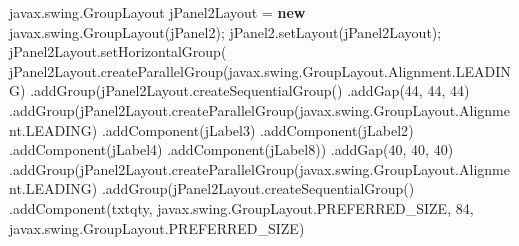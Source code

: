 \documentclass[
  10pt,
]{article}
\newenvironment{Shaded}{}{}
\newcommand{\DecValTok}[1]{\textcolor[rgb]{0.25,0.63,0.44}{#1}}
\newcommand{\FunctionTok}[1]{\textcolor[rgb]{0.02,0.16,0.49}{#1}}
\newcommand{\KeywordTok}[1]{\textcolor[rgb]{0.00,0.44,0.13}{\textbf{#1}}}
\newcommand{\NormalTok}[1]{#1}
\newcommand{\OperatorTok}[1]{\textcolor[rgb]{0.40,0.40,0.40}{#1}}
\begin{document}
\begin{Shaded}
\begin{Highlighting}[numbers=left,,]
\NormalTok{        javax}\OperatorTok{.}\FunctionTok{swing}\OperatorTok{.}\FunctionTok{GroupLayout}\NormalTok{ jPanel2Layout }\OperatorTok{=} \KeywordTok{new}\NormalTok{ javax}\OperatorTok{.}\FunctionTok{swing}\OperatorTok{.}\FunctionTok{GroupLayout}\OperatorTok{(}\NormalTok{jPanel2}\OperatorTok{);}
\NormalTok{        jPanel2}\OperatorTok{.}\FunctionTok{setLayout}\OperatorTok{(}\NormalTok{jPanel2Layout}\OperatorTok{);}
\NormalTok{        jPanel2Layout}\OperatorTok{.}\FunctionTok{setHorizontalGroup}\OperatorTok{(}
\NormalTok{            jPanel2Layout}\OperatorTok{.}\FunctionTok{createParallelGroup}\OperatorTok{(}\NormalTok{javax}\OperatorTok{.}\FunctionTok{swing}\OperatorTok{.}\FunctionTok{GroupLayout}\OperatorTok{.}\FunctionTok{Alignment}\OperatorTok{.}\FunctionTok{LEADING}\OperatorTok{)}
            \OperatorTok{.}\FunctionTok{addGroup}\OperatorTok{(}\NormalTok{jPanel2Layout}\OperatorTok{.}\FunctionTok{createSequentialGroup}\OperatorTok{()}
                \OperatorTok{.}\FunctionTok{addGap}\OperatorTok{(}\DecValTok{44}\OperatorTok{,} \DecValTok{44}\OperatorTok{,} \DecValTok{44}\OperatorTok{)}
                \OperatorTok{.}\FunctionTok{addGroup}\OperatorTok{(}\NormalTok{jPanel2Layout}\OperatorTok{.}\FunctionTok{createParallelGroup}\OperatorTok{(}\NormalTok{javax}\OperatorTok{.}\FunctionTok{swing}\OperatorTok{.}\FunctionTok{GroupLayout}\OperatorTok{.}\FunctionTok{Alignment}\OperatorTok{.}\FunctionTok{LEADING}\OperatorTok{)}
                    \OperatorTok{.}\FunctionTok{addComponent}\OperatorTok{(}\NormalTok{jLabel3}\OperatorTok{)}
                    \OperatorTok{.}\FunctionTok{addComponent}\OperatorTok{(}\NormalTok{jLabel2}\OperatorTok{)}
                    \OperatorTok{.}\FunctionTok{addComponent}\OperatorTok{(}\NormalTok{jLabel4}\OperatorTok{)}
                    \OperatorTok{.}\FunctionTok{addComponent}\OperatorTok{(}\NormalTok{jLabel8}\OperatorTok{))}
                \OperatorTok{.}\FunctionTok{addGap}\OperatorTok{(}\DecValTok{40}\OperatorTok{,} \DecValTok{40}\OperatorTok{,} \DecValTok{40}\OperatorTok{)}
                \OperatorTok{.}\FunctionTok{addGroup}\OperatorTok{(}\NormalTok{jPanel2Layout}\OperatorTok{.}\FunctionTok{createParallelGroup}\OperatorTok{(}\NormalTok{javax}\OperatorTok{.}\FunctionTok{swing}\OperatorTok{.}\FunctionTok{GroupLayout}\OperatorTok{.}\FunctionTok{Alignment}\OperatorTok{.}\FunctionTok{LEADING}\OperatorTok{)}
                    \OperatorTok{.}\FunctionTok{addGroup}\OperatorTok{(}\NormalTok{jPanel2Layout}\OperatorTok{.}\FunctionTok{createSequentialGroup}\OperatorTok{()}
                        \OperatorTok{.}\FunctionTok{addComponent}\OperatorTok{(}\NormalTok{txtqty}\OperatorTok{,}\NormalTok{ javax}\OperatorTok{.}\FunctionTok{swing}\OperatorTok{.}\FunctionTok{GroupLayout}\OperatorTok{.}\FunctionTok{PREFERRED\_SIZE}\OperatorTok{,} \DecValTok{84}\OperatorTok{,}\NormalTok{ javax}\OperatorTok{.}\FunctionTok{swing}\OperatorTok{.}\FunctionTok{GroupLayout}\OperatorTok{.}\FunctionTok{PREFERRED\_SIZE}\OperatorTok{)}

\end{Highlighting}
\end{Shaded}
\end{document}

